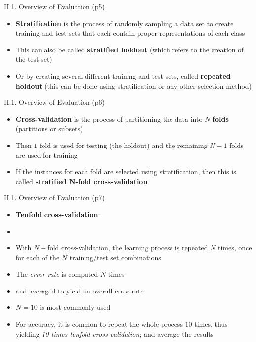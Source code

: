 \documentclass[handout]{beamer}
\newcommand{\strong}[1]{\textbf{\color{teal} #1}}
\newcommand{\stronger}[1]{\textbf{\color{purple} #1}}
\begin{document}
\begin{frame}{II.1. Overview of Evaluation (p5)}
\begin{itemize}
\item \stronger{Stratification} is the process of randomly sampling a data set to create training and test sets that each contain proper representations of each class
\item This can also be called \stronger{stratified holdout} (which refers to the creation of the test set)
\item Or by creating several different training and test sets, called \stronger{repeated holdout} (this can be done using stratification or any other selection method)
\end{itemize}
\end{frame}
\begin{frame}{II.1. Overview of Evaluation (p6)}
\begin{itemize}
\item \stronger{Cross-validation} is the process of partitioning the data into $N$ \strong{folds} (partitions or subsets)
\item Then $1$ fold is used for testing (the holdout) and the remaining $N-1$ folds are used for training
\item If the instances for each fold are selected using stratification, then this is called \stronger{stratified N-fold cross-validation}
\end{itemize}
\end{frame}
\begin{frame}{II.1. Overview of Evaluation (p7)}
\begin{itemize}
\item \stronger{Tenfold cross-validation}:
\item[]
\item With $N-$fold cross-validation, the learning process is repeated $N$ times, once for each of the $N$ training/test set combinations
\item The \emph{error rate} is computed $N$ times
\item[] and averaged to yield an overall error rate
\item $N=10$ is most commonly used
\item For accuracy, it is common to repeat the whole process $10$ times, thus yielding \emph{10 times tenfold cross-validation}; and average the results
\end{itemize}
\end{frame}
\end{document}
